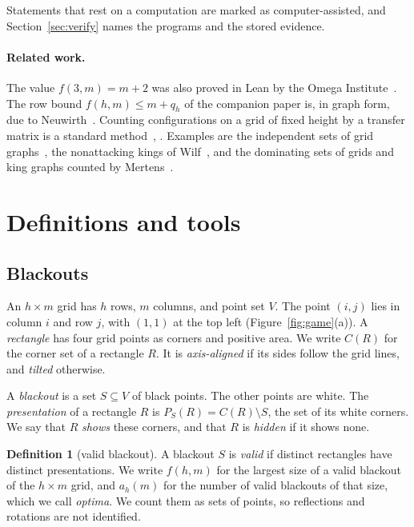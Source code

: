 \documentclass[12pt]{article}
\theoremstyle{plain}
\theoremstyle{definition}
\newtheorem{definition}[theorem]{Definition}
\theoremstyle{remark}
\newcommand{\pres}{P_S}
\begin{document}
Statements that rest on a computation are marked as computer-assisted, and
Section~\ref{sec:verify} names the programs and the stored evidence.

\paragraph{Related work.} The value $f(3,m)=m+2$ was also proved
in Lean by the Omega Institute~\cite{trureturing2026}. The row bound
$f(h,m)\le m+q_h$ of the companion paper is, in graph form, due to
Neuwirth~\cite[Theorem~1(ii) and Proposition~17]{neuwirth2001}. Counting
configurations on a grid of fixed height by a transfer matrix is a standard
method~\cite[Section~4.7]{stanley2012}, \cite[Proposition~V.6]{flajolet2009}.
Examples are the independent sets of grid
graphs~\cite{calkinwilf1998,euler2005}, the nonattacking kings of
Wilf~\cite{wilf1995}, and the dominating sets of grids and king graphs counted
by Mertens~\cite{mertens2024}.
\section{Definitions and tools}\label{sec:setup}

\subsection{Blackouts}

An $h\times m$ grid has $h$ rows, $m$ columns, and point set $V$. The point
$(i,j)$ lies in column $i$ and row $j$, with $(1,1)$ at the top left
(Figure~\ref{fig:game}(a)). A \emph{rectangle} has four grid points as corners
and positive area. We write $C(R)$ for the corner set of a rectangle $R$. It is
\emph{axis-aligned} if its sides follow the grid lines, and \emph{tilted}
otherwise.

A \emph{blackout} is a set $S\subseteq V$ of black points. The other points are
white. The \emph{presentation} of a rectangle $R$ is $\pres(R)=C(R)\setminus S$,
the set of its white corners. We say that $R$ \emph{shows} these corners, and
that $R$ is \emph{hidden} if it shows none.

\begin{definition}[valid blackout]\label{def:valid}
A blackout $S$ is \emph{valid} if distinct rectangles have distinct
presentations. We write $f(h,m)$ for the largest size of a valid blackout
of the $h\times m$ grid, and $a_h(m)$ for the number of valid blackouts of that
size, which we call \emph{optima}. We count them as sets of points, so
reflections and rotations are not identified.
\end{definition}
\end{document}
